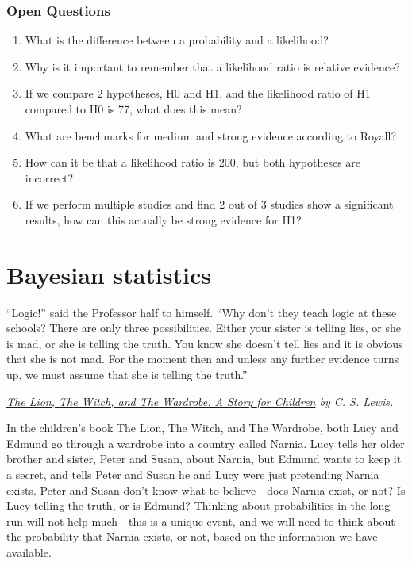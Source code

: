 \documentclass[
  oneside]{krantz}
\renewenvironment{quote}{\begin{VF}}{\end{VF}}
\begin{document}
\hypertarget{open-questions-2}{%
\subsection{Open Questions}\label{open-questions-2}}

\begin{enumerate}
\def\labelenumi{\arabic{enumi}.}
\item
  What is the difference between a probability and a likelihood?
\item
  Why is it important to remember that a likelihood ratio is relative evidence?
\item
  If we compare 2 hypotheses, H0 and H1, and the likelihood ratio of H1 compared to H0 is 77, what does this mean?
\item
  What are benchmarks for medium and strong evidence according to Royall?
\item
  How can it be that a likelihood ratio is 200, but both hypotheses are incorrect?
\item
  If we perform multiple studies and find 2 out of 3 studies show a significant results, how can this actually be strong evidence for H1?
\end{enumerate}

\hypertarget{bayes}{%
\chapter{Bayesian statistics}\label{bayes}}

\begin{quote}
``Logic!'' said the Professor half to himself. ``Why don't they teach logic at these schools? There are only three possibilities. Either your sister is telling lies, or she is mad, or she is telling the truth. You know she doesn't tell lies and it is obvious that she is not mad. For the moment then and unless any further evidence turns up, we must assume that she is telling the truth.''
\end{quote}

\emph{\href{https://gutenberg.ca/ebooks/lewiscs-thelionthewitchandthewardrobe/lewiscs-thelionthewitchandthewardrobe-00-h.html}{The Lion, The Witch, and The Wardrobe. A Story for Children} by C. S. Lewis.}

In the children's book The Lion, The Witch, and The Wardrobe, both Lucy and Edmund go through a wardrobe into a country called Narnia. Lucy tells her older brother and sister, Peter and Susan, about Narnia, but Edmund wants to keep it a secret, and tells Peter and Susan he and Lucy were just pretending Narnia exists. Peter and Susan don't know what to believe - does Narnia exist, or not? Is Lucy telling the truth, or is Edmund? Thinking about probabilities in the long run will not help much - this is a unique event, and we will need to think about the probability that Narnia exists, or not, based on the information we have available.
\end{document}
